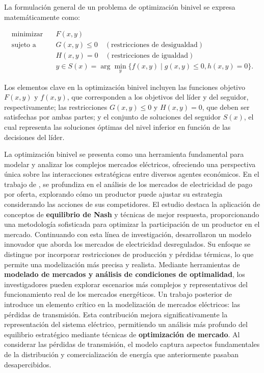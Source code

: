La formulación general de un problema de optimización binivel se expresa matemáticamente como:  

\begin{equation}
\begin{aligned}
\text{minimizar} & \quad F(x, y) \\
\text{sujeto a} & \quad G(x, y) \leq 0 \quad (\text{restricciones de desigualdad}) \\
& \quad H(x, y) = 0 \quad (\text{restricciones de igualdad}) \\
& \quad y \in S(x) = \arg \min_{y} \{ f(x, y) \mid g(x, y) \leq 0, h(x, y) = 0 \}.
\end{aligned}
\end{equation}

Los elementos clave en la optimización binivel incluyen las funciones objetivo $F(x, y)$ y $f(x, y)$, que corresponden a los objetivos del líder y del seguidor, respectivamente; las restricciones $G(x, y) \leq 0$ y $H(x, y) = 0$, que deben ser satisfechas por ambas partes; y el conjunto de soluciones del seguidor $S(x)$, el cual representa las soluciones óptimas del nivel inferior en función de las decisiones del líder.

La optimización binivel se presenta como una herramienta fundamental para modelar y analizar los complejos mercados eléctricos, ofreciendo una perspectiva única sobre las interacciones estratégicas entre diversos agentes económicos.
En el trabajo de \cite{Aussel2017NashEI}, se profundiza en el análisis de los mercados de electricidad de pago por oferta, explorando cómo un productor puede ajustar su estrategia considerando las acciones de sus competidores. El estudio destaca la aplicación de conceptos de \textbf{equilibrio de Nash} y técnicas de mejor respuesta, proporcionando una metodología sofisticada para optimizar la participación de un productor en el mercado.
Continuando con esta línea de investigación, \cite{Aussel2016DeregulatedEM} desarrollaron un modelo innovador que aborda los mercados de electricidad desregulados. Su enfoque se distingue por incorporar restricciones de producción y pérdidas térmicas, lo que permite una modelización más precisa y realista. Mediante herramientas de \textbf{modelado de mercados y análisis de condiciones de optimalidad}, los investigadores pueden explorar escenarios más complejos y representativos del funcionamiento real de los mercados energéticos.
Un trabajo posterior de \cite{Aussel2013ElectricitySM} introduce un elemento crítico en la modelización de mercados eléctricos: las pérdidas de transmisión. Esta contribución mejora significativamente la representación del sistema eléctrico, permitiendo un análisis más profundo del equilibrio estratégico mediante técnicas de \textbf{optimización de mercado}. Al considerar las pérdidas de transmisión, el modelo captura aspectos fundamentales de la distribución y comercialización de energía que anteriormente pasaban desapercibidos.


